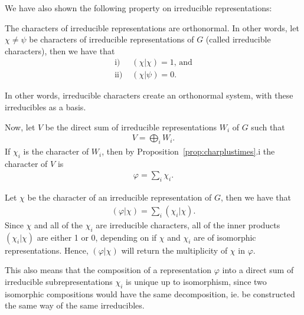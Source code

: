 
We have also shown the following property on irreducible representations:

\begin{theorem}\label{thm:irredcrit}
	The characters of irreducible representations are orthonormal. In other words, let $\chi \neq \psi$ be characters of irreducible representations of $G$ (called irreducible characters), then we have that 
	\begin{align*}
		\text{i) }& (\chi|\chi)= 1 \text{, and}  \\
		\text{ii) }& (\chi|\psi) = 0.
	\end{align*}  
\end{theorem}

In other words, irreducible characters create an orthonormal system, with these irreducibles as a basis.

Now, let $V$ be the direct sum of irreducible representations $W_i$ of $G$ such that
\begin{align*}
	V = \bigoplus_i W_i.
\end{align*}
If $\chi_i$ is the character of $W_i$, then by Proposition~\ref{prop:charplustimes}.i the character of $V$ is
\begin{align*}
	\varphi = \sum_i \chi_i.
\end{align*}

Let $\chi$ be the character of an irreducible representation of $G$, then we have that
\begin{align*}
	(\varphi|\chi) = \sum_i (\chi_i|\chi).
\end{align*}
Since $\chi$ and all of the $\chi_i$ are irreducible characters, all of the inner products $(\chi_i|\chi)$ are either 1 or 0, depending on if $\chi$ and $\chi_i$ are of isomorphic representations. Hence, $(\varphi|\chi)$ will return the multiplicity of $\chi$ in $\varphi$. 

\begin{remark}
	This also means that the composition of a representation $\varphi$ into a direct sum of irreducible subrepresentations $\chi_i$ is unique up to isomorphism, since two isomorphic compositions would have the same decomposition, ie. be constructed the same way of the same irreducibles.
\end{remark}

